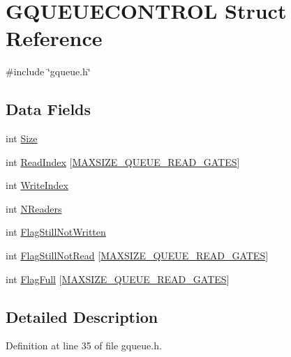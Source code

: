 \hypertarget{structGQUEUECONTROL}{\section{G\-Q\-U\-E\-U\-E\-C\-O\-N\-T\-R\-O\-L Struct Reference}
\label{structGQUEUECONTROL}
}


{\ttfamily \#include \char`\"{}gqueue.\-h\char`\"{}}

\subsection*{Data Fields}
\begin{DoxyCompactItemize}
\item 
int \hyperlink{structGQUEUECONTROL_a4db75bcca77dbc6ea7d8d5c3cd3a365f}{Size}
\item 
int \hyperlink{structGQUEUECONTROL_aed43ab94887b0e203a23877fb26988b6}{Read\-Index} \mbox{[}\hyperlink{gqueue_8h_ac3f84fecc52fe0f23ea7d5157cb92997}{M\-A\-X\-S\-I\-Z\-E\-\_\-\-Q\-U\-E\-U\-E\-\_\-\-R\-E\-A\-D\-\_\-\-G\-A\-T\-E\-S}\mbox{]}
\item 
int \hyperlink{structGQUEUECONTROL_a614237a6b5ee3fca394e40a0274d5b43}{Write\-Index}
\item 
int \hyperlink{structGQUEUECONTROL_a790618cf693d7e4249fec2f5074b40e3}{N\-Readers}
\item 
int \hyperlink{structGQUEUECONTROL_a4d58bdb6b0dc93bb6034c4209b6e7915}{Flag\-Still\-Not\-Written}
\item 
int \hyperlink{structGQUEUECONTROL_a9336a08f0410235b38b78638b0e3f882}{Flag\-Still\-Not\-Read} \mbox{[}\hyperlink{gqueue_8h_ac3f84fecc52fe0f23ea7d5157cb92997}{M\-A\-X\-S\-I\-Z\-E\-\_\-\-Q\-U\-E\-U\-E\-\_\-\-R\-E\-A\-D\-\_\-\-G\-A\-T\-E\-S}\mbox{]}
\item 
int \hyperlink{structGQUEUECONTROL_a5f54a26afa8554ed2f161b83aba14f5c}{Flag\-Full} \mbox{[}\hyperlink{gqueue_8h_ac3f84fecc52fe0f23ea7d5157cb92997}{M\-A\-X\-S\-I\-Z\-E\-\_\-\-Q\-U\-E\-U\-E\-\_\-\-R\-E\-A\-D\-\_\-\-G\-A\-T\-E\-S}\mbox{]}
\end{DoxyCompactItemize}


\subsection{Detailed Description}


Definition at line 35 of file gqueue.\-h.



